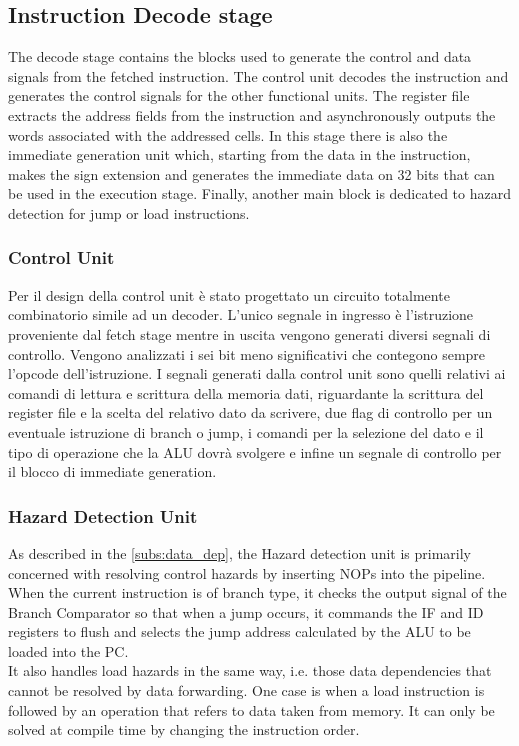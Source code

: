 \subsection{Instruction Decode stage}
The decode stage contains the blocks used to generate the control and data signals from the fetched instruction. The control unit decodes the instruction and generates the control signals for the other functional units. The register file extracts the address fields from the instruction and asynchronously outputs the words associated with the addressed cells. In this stage there is also the immediate generation unit which, starting from the data in the instruction, makes the sign extension and generates the immediate data on 32 bits that can be used in the execution stage. Finally, another main block is dedicated to hazard detection for jump or load instructions.

\subsubsection{Control Unit}
Per il design della control unit è stato progettato un circuito totalmente combinatorio simile ad un decoder. L'unico segnale in ingresso è l'istruzione proveniente dal fetch stage mentre in uscita vengono generati diversi segnali di controllo. Vengono analizzati i sei bit meno significativi che contegono sempre l'opcode dell'istruzione.
I segnali generati dalla control unit sono quelli relativi ai comandi di lettura e scrittura della memoria dati, riguardante la scrittura del register file e la scelta del relativo dato da scrivere, due flag di controllo per un eventuale istruzione di branch o jump, i comandi per la selezione del dato e il tipo di operazione che la ALU dovrà svolgere e infine un segnale di controllo per il blocco di immediate generation.


\subsubsection{Hazard Detection Unit}
As described in the \autoref{subs:data_dep}, the Hazard detection unit is primarily concerned with resolving control hazards by inserting NOPs into the pipeline.
When the current instruction is of branch type, it checks the output signal of the Branch Comparator so that when a jump occurs, it commands the IF and ID registers to flush and selects the jump address calculated by the ALU to be loaded into the PC.\\
It also handles load hazards in the same way, i.e. those data dependencies that cannot be resolved by data forwarding. One case is when a load instruction is followed by an operation that refers to data taken from memory. It can only be solved at compile time by changing the instruction order.

